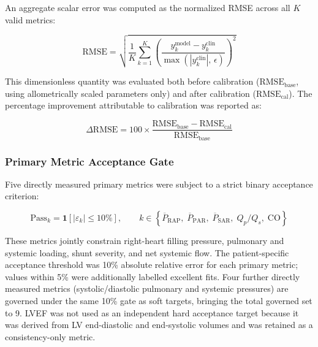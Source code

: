 \documentclass{article}
\begin{document}
An aggregate scalar error was computed as the normalized RMSE
across all $K$ valid metrics:

\begin{equation}
    \mathrm{RMSE}
    = \sqrt{\frac{1}{K}
            \sum_{k=1}^{K}
            \left(
                \frac{y_k^\mathrm{model} - y_k^\mathrm{clin}}
                     {\max\!\left(|y_k^\mathrm{clin}|,\, \epsilon\right)}
            \right)^2}
    \label{eq:nrmse}
\end{equation}

\noindent This dimensionless quantity was evaluated both before
calibration ($\mathrm{RMSE}_\mathrm{base}$, using allometrically
scaled parameters only) and after calibration
($\mathrm{RMSE}_\mathrm{cal}$). The percentage improvement
attributable to calibration was reported as:

\begin{equation}
    \Delta\mathrm{RMSE}
    = 100 \times
      \frac{\mathrm{RMSE}_\mathrm{base} - \mathrm{RMSE}_\mathrm{cal}}
           {\mathrm{RMSE}_\mathrm{base}}
    \label{eq:rmse_improvement}
\end{equation}

\subsubsection{Primary Metric Acceptance Gate}

Five directly measured primary metrics were subject to a strict
binary acceptance criterion:

\begin{equation}
    \mathrm{Pass}_k
    = \mathbf{1}\!\left[|\varepsilon_k| \leq 10\%\right],
    \qquad
    k \in \left\{\overline{P}_\mathrm{RAP},\;
                 \overline{P}_\mathrm{PAR},\;
                 \overline{P}_\mathrm{SAR},\;
                 Q_p/Q_s,\;
                 \mathrm{CO}\right\}
    \label{eq:gate}
\end{equation}

\noindent These metrics jointly constrain right-heart filling pressure,
pulmonary and systemic loading, shunt severity, and net systemic flow. The
patient-specific acceptance threshold was 10\% absolute relative error for each
primary metric; values within 5\% were additionally labelled excellent fits.
Four further directly measured metrics (systolic/diastolic pulmonary and
systemic pressures) are governed under the same 10\% gate as soft targets,
bringing the total governed set to 9. LVEF was not used as an independent hard acceptance target because it was
derived from LV end-diastolic and end-systolic volumes and was retained as a
consistency-only metric.
\end{document}
